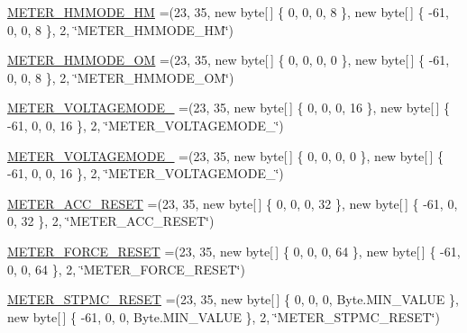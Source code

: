 \begin{DoxyCompactItemize}
\item 
\hyperlink{enumcom_1_1eneri_1_1scorpio__metertool_1_1hardwarelayer_1_1_flags_passwords_a07d7c2274d68fc7df73f96c89e55d850}{M\+E\+T\+E\+R\+\_\+\+H\+M\+M\+O\+D\+E\+\_\+\+HM} =(23, 35, new byte\mbox{[}$\,$\mbox{]} \{ 0, 0, 0, 8 \}, new byte\mbox{[}$\,$\mbox{]} \{ -\/61, 0, 0, 8 \}, 2, \char`\"{}M\+E\+T\+E\+R\+\_\+\+H\+M\+M\+O\+D\+E\+\_\+\+HM\char`\"{})
\item 
\hyperlink{enumcom_1_1eneri_1_1scorpio__metertool_1_1hardwarelayer_1_1_flags_passwords_ab28f1db71cddbf3be5516658f62a5f46}{M\+E\+T\+E\+R\+\_\+\+H\+M\+M\+O\+D\+E\+\_\+\+OM} =(23, 35, new byte\mbox{[}$\,$\mbox{]} \{ 0, 0, 0, 0 \}, new byte\mbox{[}$\,$\mbox{]} \{ -\/61, 0, 0, 8 \}, 2, \char`\"{}M\+E\+T\+E\+R\+\_\+\+H\+M\+M\+O\+D\+E\+\_\+\+OM\char`\"{})
\item 
\hyperlink{enumcom_1_1eneri_1_1scorpio__metertool_1_1hardwarelayer_1_1_flags_passwords_a9418f10c795a536e40f6cd8c9f241bcc}{M\+E\+T\+E\+R\+\_\+\+V\+O\+L\+T\+A\+G\+E\+M\+O\+D\+E\+\_} =(23, 35, new byte\mbox{[}$\,$\mbox{]} \{ 0, 0, 0, 16 \}, new byte\mbox{[}$\,$\mbox{]} \{ -\/61, 0, 0, 16 \}, 2, \char`\"{}M\+E\+T\+E\+R\+\_\+\+V\+O\+L\+T\+A\+G\+E\+M\+O\+D\+E\+\_\char`\"{})
\item 
\hyperlink{enumcom_1_1eneri_1_1scorpio__metertool_1_1hardwarelayer_1_1_flags_passwords_a22495e967de81cc83a1d62f092ac02fd}{M\+E\+T\+E\+R\+\_\+\+V\+O\+L\+T\+A\+G\+E\+M\+O\+D\+E\+\_} =(23, 35, new byte\mbox{[}$\,$\mbox{]} \{ 0, 0, 0, 0 \}, new byte\mbox{[}$\,$\mbox{]} \{ -\/61, 0, 0, 16 \}, 2, \char`\"{}M\+E\+T\+E\+R\+\_\+\+V\+O\+L\+T\+A\+G\+E\+M\+O\+D\+E\+\_\char`\"{})
\item 
\hyperlink{enumcom_1_1eneri_1_1scorpio__metertool_1_1hardwarelayer_1_1_flags_passwords_a1ced69ce2c018886a92ebfbad674f073}{M\+E\+T\+E\+R\+\_\+\+A\+C\+C\+\_\+\+R\+E\+S\+ET} =(23, 35, new byte\mbox{[}$\,$\mbox{]} \{ 0, 0, 0, 32 \}, new byte\mbox{[}$\,$\mbox{]} \{ -\/61, 0, 0, 32 \}, 2, \char`\"{}M\+E\+T\+E\+R\+\_\+\+A\+C\+C\+\_\+\+R\+E\+S\+ET\char`\"{})
\item 
\hyperlink{enumcom_1_1eneri_1_1scorpio__metertool_1_1hardwarelayer_1_1_flags_passwords_a9021a19cc5da28547974e163051d084a}{M\+E\+T\+E\+R\+\_\+\+F\+O\+R\+C\+E\+\_\+\+R\+E\+S\+ET} =(23, 35, new byte\mbox{[}$\,$\mbox{]} \{ 0, 0, 0, 64 \}, new byte\mbox{[}$\,$\mbox{]} \{ -\/61, 0, 0, 64 \}, 2, \char`\"{}M\+E\+T\+E\+R\+\_\+\+F\+O\+R\+C\+E\+\_\+\+R\+E\+S\+ET\char`\"{})
\item 
\hyperlink{enumcom_1_1eneri_1_1scorpio__metertool_1_1hardwarelayer_1_1_flags_passwords_a2471cc1bb591433a3a26175ca05294e7}{M\+E\+T\+E\+R\+\_\+\+S\+T\+P\+M\+C\+\_\+\+R\+E\+S\+ET} =(23, 35, new byte\mbox{[}$\,$\mbox{]} \{ 0, 0, 0, Byte.\+M\+I\+N\+\_\+\+V\+A\+L\+UE \}, new byte\mbox{[}$\,$\mbox{]} \{ -\/61, 0, 0, Byte.\+M\+I\+N\+\_\+\+V\+A\+L\+UE \}, 2, \char`\"{}M\+E\+T\+E\+R\+\_\+\+S\+T\+P\+M\+C\+\_\+\+R\+E\+S\+ET\char`\"{})

\end{DoxyCompactItemize}
